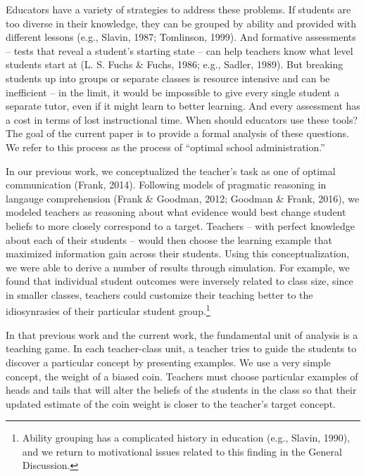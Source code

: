 \documentclass[10pt, letterpaper]{article}
\begin{document}
Educators have a variety of strategies to address these problems. If
students are too diverse in their knowledge, they can be grouped by
ability and provided with different lessons (e.g., Slavin, 1987;
Tomlinson, 1999). And formative assessments -- tests that reveal a
student's starting state -- can help teachers know what level students
start at (L. S. Fuchs \& Fuchs, 1986; e.g., Sadler, 1989). But breaking
students up into groups or separate classes is resource intensive and
can be inefficient -- in the limit, it would be impossible to give every
single student a separate tutor, even if it might learn to better
learning. And every assessment has a cost in terms of lost instructional
time. When should educators use these tools? The goal of the current
paper is to provide a formal analysis of these questions. We refer to
this process as the process of ``optimal school administration.''

In our previous work, we conceptualized the teacher's task as one of
optimal communication (Frank, 2014). Following models of pragmatic
reasoning in langauge comprehension (Frank \& Goodman, 2012; Goodman \&
Frank, 2016), we modeled teachers as reasoning about what evidence would
best change student beliefs to more closely correspond to a target.
Teachers -- with perfect knowledge about each of their students -- would
then choose the learning example that maximized information gain across
their students. Using this conceptualization, we were able to derive a
number of results through simulation. For example, we found that
individual student outcomes were inversely related to class size, since
in smaller classes, teachers could customize their teaching better to
the idiosynrasies of their particular student group.\footnote{Ability
  grouping has a complicated history in education (e.g., Slavin, 1990),
  and we return to motivational issues related to this finding in the
  General Discussion.}

In that previous work and the current work, the fundamental unit of
analysis is a teaching game. In each teacher-class unit, a teacher tries
to guide the students to discover a particular concept by presenting
examples. We use a very simple concept, the weight of a biased coin.
Teachers must choose particular examples of heads and tails that will
alter the beliefs of the students in the class so that their updated
estimate of the coin weight is closer to the teacher's target concept.
\end{document}
